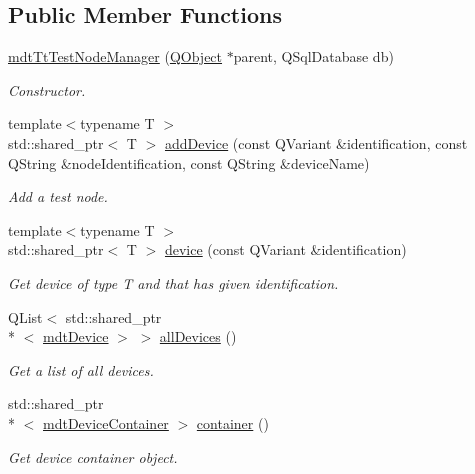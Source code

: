 \subsection*{Public Member Functions}
\begin{DoxyCompactItemize}
\item 
\hyperlink{classmdt_tt_test_node_manager_ae272a2ede47ed1bf5df446acaade76de}{mdt\-Tt\-Test\-Node\-Manager} (\hyperlink{class_q_object}{Q\-Object} $\ast$parent, Q\-Sql\-Database db)
\begin{DoxyCompactList}\small\item\em Constructor. \end{DoxyCompactList}\item 
{\footnotesize template$<$typename T $>$ }\\std\-::shared\-\_\-ptr$<$ T $>$ \hyperlink{classmdt_tt_test_node_manager_a4453ed9d1121e81b808885a62aba7bdc}{add\-Device} (const Q\-Variant \&identification, const Q\-String \&node\-Identification, const Q\-String \&device\-Name)
\begin{DoxyCompactList}\small\item\em Add a test node. \end{DoxyCompactList}\item 
{\footnotesize template$<$typename T $>$ }\\std\-::shared\-\_\-ptr$<$ T $>$ \hyperlink{classmdt_tt_test_node_manager_a7b167f9dbc72611aba52fabf4fe0d40f}{device} (const Q\-Variant \&identification)
\begin{DoxyCompactList}\small\item\em Get device of type T and that has given identification. \end{DoxyCompactList}\item 
Q\-List$<$ std\-::shared\-\_\-ptr\\*
$<$ \hyperlink{classmdt_device}{mdt\-Device} $>$ $>$ \hyperlink{classmdt_tt_test_node_manager_ad5996a8b72cf186de386818239243c2a}{all\-Devices} ()
\begin{DoxyCompactList}\small\item\em Get a list of all devices. \end{DoxyCompactList}\item 
std\-::shared\-\_\-ptr\\*
$<$ \hyperlink{classmdt_device_container}{mdt\-Device\-Container} $>$ \hyperlink{classmdt_tt_test_node_manager_aba5f78564b6ef04a748fbb02d43d18cd}{container} ()
\begin{DoxyCompactList}\small\item\em Get device container object. \end{DoxyCompactList}\item 

\end{DoxyCompactItemize}
